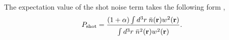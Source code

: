                                                                                                                                                                                                                                                                       The expectation value of the shot noise term takes the following form \citep{Feldman:1994aa},
                                                                                                                                                                                                                                                                      \begin{equation} \label{eq:integral_shotnoise}
                                                                                                                                                                                                                                                                        P_\mathrm{shot} = \frac{ (1+\alpha) \int d^3r \;\bar{n}({\bf r})w^2({\bf r})}{\int\limits^{ } d^3r \;\bar{n}^2({\bf r})w^2({\bf r})}. 
                                                                                                                                                                                                                                                                        \end{equation}

